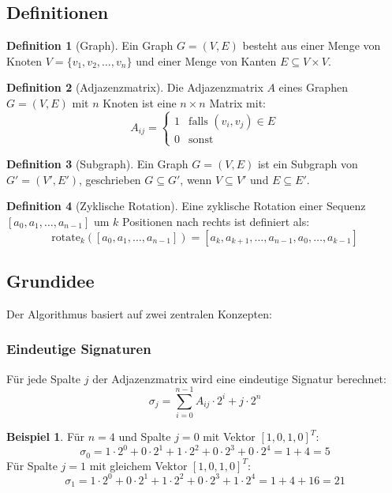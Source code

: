 ﻿\documentclass[a4paper,12pt]{article}
\theoremstyle{definition}
\newtheorem{definition}{Definition}
\newtheorem{beispiel}{Beispiel}
\begin{document}
\subsection{Definitionen}

\begin{definition}[Graph]
	Ein Graph $G = (V, E)$ besteht aus einer Menge von Knoten $V = \{v_1, v_2, \ldots, v_n\}$ und einer Menge von Kanten $E \subseteq V \times V$.
\end{definition}

\begin{definition}[Adjazenzmatrix]
	Die Adjazenzmatrix $A$ eines Graphen $G = (V, E)$ mit $n$ Knoten ist eine $n \times n$ Matrix mit:
	\[
	A_{ij} = \begin{cases}
		1 & \text{falls } (v_i, v_j) \in E \\
		0 & \text{sonst}
	\end{cases}
	\]
\end{definition}

\begin{definition}[Subgraph]
	Ein Graph $G = (V, E)$ ist ein Subgraph von $G' = (V', E')$, geschrieben $G \subseteq G'$, wenn $V \subseteq V'$ und $E \subseteq E'$.
\end{definition}

\begin{definition}[Zyklische Rotation]
	Eine zyklische Rotation einer Sequenz $[a_0, a_1, \ldots, a_{n-1}]$ um $k$ Positionen nach rechts ist definiert als:
	\[
	\text{rotate}_k([a_0, a_1, \ldots, a_{n-1}]) = [a_k, a_{k+1}, \ldots, a_{n-1}, a_0, \ldots, a_{k-1}]
	\]
\end{definition}

\subsection{Grundidee}

Der Algorithmus basiert auf zwei zentralen Konzepten:

\subsubsection{Eindeutige Signaturen}

Für jede Spalte $j$ der Adjazenzmatrix wird eine eindeutige Signatur berechnet:
\[
\sigma_j = \sum_{i=0}^{n-1} A_{ij} \cdot 2^i + j \cdot 2^n
\]

\begin{beispiel}
	Für $n=4$ und Spalte $j=0$ mit Vektor $[1, 0, 1, 0]^T$:
	\[
	\sigma_0 = 1 \cdot 2^0 + 0 \cdot 2^1 + 1 \cdot 2^2 + 0 \cdot 2^3 + 0 \cdot 2^4 = 1 + 4 = 5
	\]
	Für Spalte $j=1$ mit gleichem Vektor $[1, 0, 1, 0]^T$:
	\[
	\sigma_1 = 1 \cdot 2^0 + 0 \cdot 2^1 + 1 \cdot 2^2 + 0 \cdot 2^3 + 1 \cdot 2^4 = 1 + 4 + 16 = 21
	\]
\end{beispiel}
\end{document}

